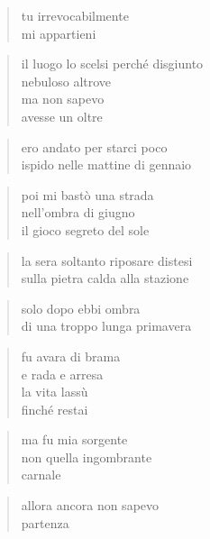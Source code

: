 \begin{verse}
    tu irrevocabilmente\\
    mi appartieni
\end{verse}

\clearpage


\begin{verse}
    il luogo lo scelsi perché disgiunto\\
    nebuloso altrove\\
    ma non sapevo\\
    avesse un oltre
\end{verse}

\begin{verse}
    ero andato per starci poco\\
    ispido nelle mattine di gennaio
\end{verse}

\begin{verse}
    poi mi bastò una strada\\
    nell'ombra di giugno\\
    il gioco segreto del sole
\end{verse}

\begin{verse}
    la sera soltanto riposare distesi\\
    sulla pietra calda alla stazione
\end{verse}

\begin{verse}
    solo dopo ebbi ombra\\
    di una troppo lunga primavera
\end{verse}

\clearpage


\begin{verse}
    fu avara di brama\\
    e rada e arresa\\
    la vita lassù\\
    finché restai
\end{verse}

\begin{verse}
    ma fu mia sorgente\\
    non quella ingombrante\\
    carnale
\end{verse}

\begin{verse}
    allora ancora non sapevo\\
    partenza
\end{verse}
